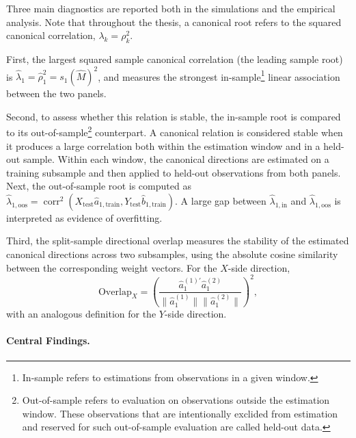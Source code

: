 \documentclass[12pt]{report} %
\begin{document}
Three main diagnostics are reported both in the simulations and the empirical analysis. 
Note that throughout the thesis, a canonical root refers to the squared canonical correlation, \(\lambda_k = \rho_k^2\).

First, the largest squared sample canonical correlation 
(the leading sample root) is 
$\widehat{\lambda}_1=\widehat{\rho}_1^2=s_1(\widehat{M})^2$,
and measures the strongest in-sample\footnote{In-sample refers to estimations from observations in a given window.} linear association between the two panels. 

Second, to assess whether this relation is stable, the in-sample root is compared to its out-of-sample\footnote{Out-of-sample refers to 
evaluation on observations outside the estimation window. These observations that are intentionally exclided from 
estimation and reserved for such out-of-sample evaluation are called held-out data.} 
counterpart. A canonical relation is considered stable when it produces a large 
correlation both within the estimation window and in a held-out sample. Within each window, the 
canonical directions are estimated on a training subsample and then applied to held-out observations 
from both panels. Next, the out-of-sample root is computed as
$\widehat{\lambda}_{1,\mathrm{oos}}
=
\operatorname{corr}^2
\left(
X_{\mathrm{test}}\widehat{a}_{1,\mathrm{train}},
Y_{\mathrm{test}}\widehat{b}_{1,\mathrm{train}}
\right)$.
A large gap between \(\widehat{\lambda}_{1,\mathrm{in}}\) and \(\widehat{\lambda}_{1,\mathrm{oos}}\) is interpreted as evidence of overfitting.

Third, the split-sample directional overlap measures the stability of the estimated canonical 
directions across two subsamples, using the absolute cosine similarity between the corresponding 
weight vectors. For the \(X\)-side direction,
\[
\mathrm{Overlap}_X
=
\left(
\frac{
\widehat{a}_{1}^{(1)\prime}\widehat{a}_{1}^{(2)}
}{
\|\widehat{a}_{1}^{(1)}\|\|\widehat{a}_{1}^{(2)}\|
}
\right)^2,
\]
with an analogous definition for the \(Y\)-side direction. 


\paragraph{Central Findings.}
\end{document}
